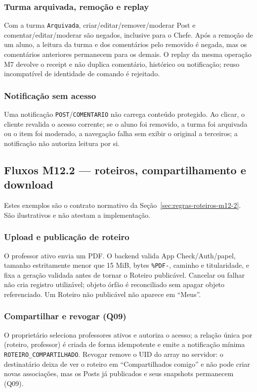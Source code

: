 \subsubsection{Turma arquivada, remoção e replay}
Com a turma \texttt{Arquivada}, criar/editar/remover/moderar Post e
comentar/editar/moderar são negados, inclusive para o Chefe. Após a remoção de
um aluno, a leitura da turma e dos comentários pelo removido é negada, mas os
comentários anteriores permanecem para os demais. O replay da mesma operação M7
devolve o receipt e não duplica comentário, histórico ou notificação; reuso
incompatível de identidade de comando é rejeitado.

\subsubsection{Notificação sem acesso}
Uma notificação \texttt{POST}/\texttt{COMENTARIO} não carrega conteúdo
protegido. Ao clicar, o cliente revalida o acesso corrente; se o aluno foi
removido, a turma foi arquivada ou o item foi moderado, a navegação falha sem
exibir o original a terceiros; a notificação não autoriza leitura por si.

\subsection{Fluxos M12.2 --- roteiros, compartilhamento e download}
Estes exemplos são o contrato normativo da
Seção~\ref{sec:regras-roteiros-m12-2}. São ilustrativos e não atestam a
implementação.

\subsubsection{Upload e publicação de roteiro}
O professor ativo envia um PDF. O backend valida App Check/Auth/papel, tamanho
estritamente menor que 15 MiB, bytes \texttt{\%PDF-}, caminho e titularidade, e
fixa a geração validada antes de tornar o Roteiro publicável. Cancelar ou falhar
não cria registro utilizável; objeto órfão é reconciliado sem apagar objeto
referenciado. Um Roteiro não publicável não aparece em ``Meus''.

\subsubsection{Compartilhar e revogar (Q09)}
O proprietário seleciona professores ativos e autoriza o acesso; a relação
única por (roteiro, professor) é criada de forma idempotente e emite a
notificação mínima \texttt{ROTEIRO\_COMPARTILHADO}. Revogar remove o UID do
array no servidor: o destinatário deixa de ver o roteiro em ``Compartilhados
comigo'' e não pode criar novas associações, mas os Posts já publicados e seus
snapshots permanecem (Q09).

